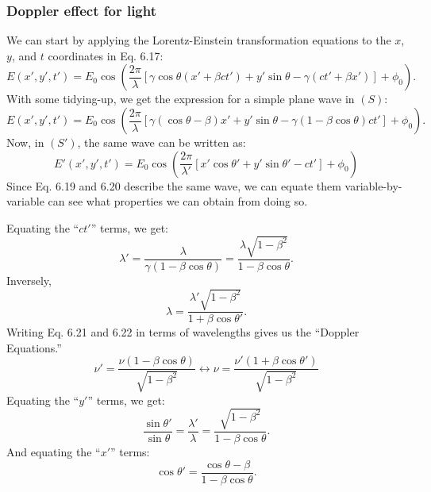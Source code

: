 \documentclass[a4paper,11pt]{article}
\numberwithin{equation}{section}
\begin{document}
 \subsubsection{Doppler effect for light}
 We can start by applying the Lorentz-Einstein transformation equations to the $x$, $y$, and $t$ coordinates in Eq. 6.17:
 \begin{equation}
 E(x',y',t')=E_0\cos\left( \frac{2\pi}{\lambda}\left[ \gamma\cos\theta(x'+\beta ct') + y'\sin\theta - \gamma(ct'+\beta x')\right] + \phi_0\right). 
 \end{equation}
 With some tidying-up, we get the expression for a simple plane wave in $(S)$:
 \begin{equation}
 E(x',y',t')=E_0\cos\left( \frac{2\pi}{\lambda}\left[ \gamma(\cos\theta-\beta)x' + y'\sin\theta - \gamma(1-\beta\cos\theta)ct'\right]  + \phi_0\right). 
 \end{equation}
 Now, in $(S')$, the same wave can be written as:
 \begin{equation}
 E'(x',y',t')=E_0\cos\left( \frac{2\pi}{\lambda'}\left[ x'\cos\theta' + y'\sin\theta' -ct' \right] +\phi_0\right) 
 \end{equation}
 Since Eq. 6.19 and 6.20 describe the same wave, we can equate them variable-by-variable can see what properties we can obtain from doing so.
 
 \noindent  Equating the ``$ct'$'' terms, we get:
 \begin{equation}
 \lambda' = \frac{\lambda}{\gamma(1-\beta\cos\theta)} = \frac{\lambda\sqrt{1-\beta^2}}{1-\beta\cos\theta}.
 \end{equation}
 Inversely,
 \begin{equation}
 \lambda=\frac{\lambda'\sqrt{1-\beta^2}}{1+\beta\cos\theta'}.
 \end{equation}
 Writing Eq. 6.21 and 6.22 in terms of wavelengths gives us the ``Doppler Equations.''
 \begin{equation}
 \nu'=\frac{\nu(1-\beta\cos\theta)}{\sqrt{1-\beta^2}} \leftrightarrow \nu=\frac{\nu'(1+\beta\cos\theta')}{\sqrt{1-\beta^2}}
 \end{equation}
 \noindent Equating the ``$y'$'' terms, we get:
 \begin{equation}
 \frac{\sin\theta'}{\sin\theta}=\frac{\lambda'}{\lambda}=\frac{\sqrt{1-\beta^2}}{1-\beta\cos\theta}.
 \end{equation}
 \noindent And equating the ``$x'$'' terms:
 \begin{equation}
 \cos\theta'=\frac{\cos\theta-\beta}{1-\beta\cos\theta}.
 \end{equation}
 
\end{document}
